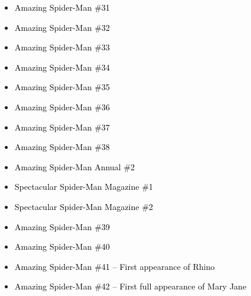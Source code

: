 \documentclass[12pt]{article}
\newcommand{\checkbox}{\raisebox{0.0ex}{\fbox{\rule{0ex}{1.5ex} \rule{1.5ex}{0ex}}}}
\begin{document}
\begin{center}
\begin{tcolorbox}[colback=white!95!gray, colframe=black, width=0.9\textwidth, arc=4mm, auto outer arc, boxrule=0.8pt]
\begin{itemize}[left=0pt,label={\checkbox}]
    \item \textcolor{black}{Amazing Spider-Man \#31}
    \item \textcolor{black}{Amazing Spider-Man \#32}
    \item \textcolor{black}{Amazing Spider-Man \#33}
    \item \textcolor{black}{Amazing Spider-Man \#34}
    \item \textcolor{black}{Amazing Spider-Man \#35}
    \item \textcolor{black}{Amazing Spider-Man \#36}
    \item \textcolor{black}{Amazing Spider-Man \#37}
    \item \textcolor{black}{Amazing Spider-Man \#38}
    \item \textcolor{black}{Amazing Spider-Man Annual \#2}
    \item \textcolor{black}{Spectacular Spider-Man Magazine \#1}
    \item \textcolor{black}{Spectacular Spider-Man Magazine \#2}
    \item \textcolor{black}{Amazing Spider-Man \#39}
    \item \textcolor{black}{Amazing Spider-Man \#40}
    \item \textcolor{black}{Amazing Spider-Man \#41 – First appearance of Rhino}
    \item \textcolor{black}{Amazing Spider-Man \#42 – First full appearance of Mary Jane}
\end{itemize}
\end{tcolorbox}
\end{center}
\end{document}
